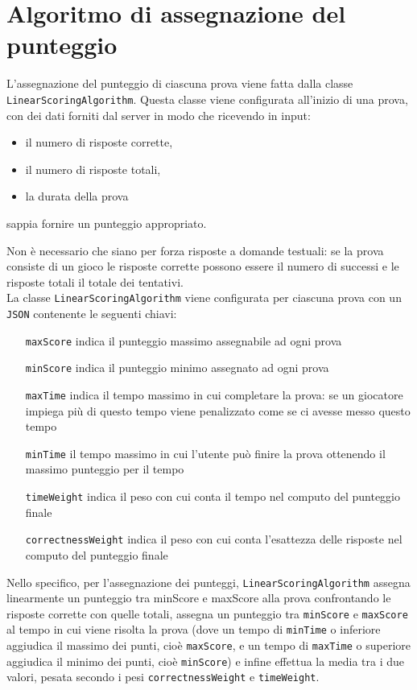 \section{Algoritmo di assegnazione del punteggio}
\label{sec:Algoritmo di assegnazione del punteggio}

L'assegnazione del punteggio di ciascuna prova viene fatta dalla classe \texttt{LinearScoringAlgorithm}. Questa classe viene configurata all'inizio di una prova, con dei dati forniti dal server in modo che ricevendo in input:
\begin{itemize}
   \item il numero di risposte corrette,
   \item il numero di risposte totali,
   \item la durata della prova
\end{itemize}
sappia fornire un punteggio appropriato.

Non è necessario che siano per forza risposte a domande testuali: se la prova consiste di un gioco le risposte corrette possono essere il numero di successi e le risposte totali il totale dei tentativi. \\

La classe \texttt{LinearScoringAlgorithm} viene configurata per ciascuna prova con un \texttt{JSON} contenente le seguenti chiavi:
\begin{itemize}
   \item[\texttt{maxScore}] indica il punteggio massimo assegnabile ad ogni prova
   \item[\texttt{minScore}] indica il punteggio minimo assegnato ad ogni prova
   \item[\texttt{maxTime}] indica il tempo massimo in cui completare la prova: se un giocatore impiega più di questo tempo viene penalizzato come se ci avesse messo questo tempo
   \item[\texttt{minTime}] il tempo massimo in cui l'utente può finire la prova ottenendo il massimo punteggio per il tempo
   \item[\texttt{timeWeight}] indica il peso con cui conta il tempo nel computo del punteggio finale
   \item[\texttt{correctnessWeight}] indica il peso con cui conta l'esattezza delle risposte nel computo del punteggio finale
\end{itemize}

Nello specifico, per l'assegnazione dei punteggi, \texttt{LinearScoringAlgorithm} assegna linearmente un punteggio tra minScore e maxScore alla prova confrontando le risposte corrette con quelle totali, assegna un punteggio tra \texttt{minScore} e \texttt{maxScore} al tempo in cui viene risolta la prova (dove un tempo di \texttt{minTime} o inferiore aggiudica il massimo dei punti, cioè \texttt{maxScore}, e un tempo di \texttt{maxTime} o superiore aggiudica il minimo dei punti, cioè \texttt{minScore}) e infine effettua la media tra i due valori, pesata secondo i pesi \texttt{correctnessWeight} e \texttt{timeWeight}.

